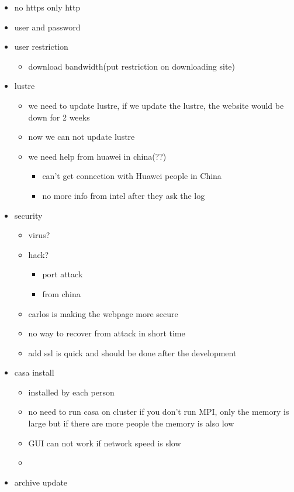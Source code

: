 \documentclass[11pt]{article}
\begin{document}
\begin{itemize}
\item no https only http
\item user and password
\item user restriction
\begin{itemize}
\item download bandwidth(put restriction on downloading site)
\end{itemize}
\item lustre
\begin{itemize}
\item we need to update lustre, if we update the lustre, the website would be down for 2 weeks
\item now we can not update lustre
\item we need help from huawei in china(??)
\begin{itemize}
\item can't get connection with Huawei people in China
\item no more info from intel after they ask the log
\end{itemize}
\end{itemize}
\item security
\begin{itemize}
\item virus?
\item hack?
\begin{itemize}
\item port attack
\item from china
\end{itemize}
\item carlos is making the webpage more secure
\item no way to recover from attack in short time
\item add ssl is quick and should be done after the development
\end{itemize}
\item casa install
\begin{itemize}
\item installed by each person
\item no need to run casa on cluster if you don't run MPI, only the memory is large but if there are more people the memory is also low
\item GUI can not work if network speed is slow
\item 
\end{itemize}
\item archive update

\end{itemize}
\end{document}
